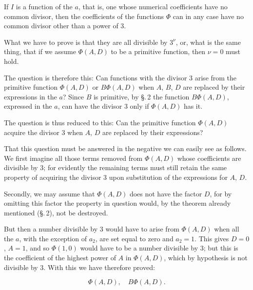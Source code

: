 If $I$ is a  function of the $a$, that is, one whose
numerical coefficients have no common divisor, then the coefficients of the
functions $\Phi$ can in any case have no common divisor other than a power
of 3.

What we have to prove is that they are all divisible by $3^\nu$, or, what is
the same thing, that if we assume $\Phi(A, D)$ to be a primitive function,
then $\nu = 0$ must hold.

The question is therefore this: Can functions with the divisor 3 arise from
the primitive function $\Phi(A, D)$ or $B\Phi(A, D)$ when $A$, $B$, $D$ are
replaced by their expressions in the $a$? Since $B$ is primitive, by
\S.\,2 the function $B\Phi(A, D)$, expressed in the $a$, can have the
divisor 3 only if $\Phi(A, D)$ has it.

The question is thus reduced to this: Can the primitive function
$\Phi(A, D)$ acquire the divisor 3 when $A$, $D$ are replaced by their
expressions?

That this question must be answered in the negative we can easily see as
follows. We first imagine all those terms removed from $\Phi(A, D)$ whose
coefficients are divisible by 3; for evidently the remaining terms must
still retain the same property of acquiring the divisor 3 upon substitution
of the expressions for $A$, $D$.

Secondly, we may assume that $\Phi(A, D)$ does not have the factor $D$, for
by omitting this factor the property in question would, by the theorem
already mentioned (\S.\,2), not be destroyed.

But then a number divisible by 3 would have to arise from $\Phi(A, D)$ when
all the $a$, with the exception of $a_2$, are set equal to zero and
$a_2 = 1$. This gives $D = 0$, $A = 1$, and so $\Phi(1, 0)$ would have to be
a number divisible by 3; but this is the coefficient of the highest power of
$A$ in $\Phi(A, D)$, which by hypothesis is not divisible by 3.
With this we have therefore proved:

\[
\Phi(A, D), \quad B\Phi(A, D).
\]
